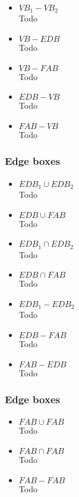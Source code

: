 \documentclass[twoside]{article}
\begin{document}
\begin{multicols}{2}
\begin{itemize}
\item $VB_1 - VB_2$
\\
Todo

\item $VB - EDB$
\\
Todo

\item $VB - FAB$
\\
Todo

\item $EDB - VB$
\\
Todo

\item $FAB - VB$
\\
Todo

\end{itemize}

\subsubsection{Edge boxes}
\begin{itemize}
\item $EDB_1 \cup EDB_2$
\\
Todo

\item $EDB \cup FAB$
\\
Todo

\item $EDB_1 \cap EDB_2$
\\
Todo

\item $EDB \cap FAB$
\\
Todo

\item $EDB_1 - EDB_2$
\\
Todo

\item $EDB - FAB$
\\
Todo

\item $FAB - EDB$
\\
Todo
\end{itemize}

\subsubsection{Edge boxes}
\begin{itemize}
\item $FAB \cup FAB$
\\
Todo

\item $FAB \cap FAB$
\\
Todo

\item $FAB - FAB$
\\
Todo

\end{itemize}

\end{multicols}
\end{document}
